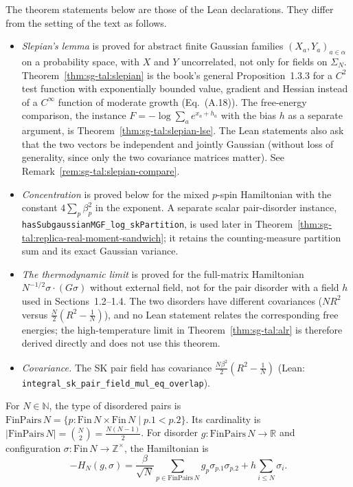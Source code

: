 \begin{remark}\label{rem:sg-tal:dev-11}
The theorem statements below are those of the Lean declarations. They differ from the setting of the text as follows.
\begin{itemize}
\item \emph{Slepian's lemma} is proved for abstract finite Gaussian families $(X_a,Y_a)_{a\in\alpha}$ on a probability space, with $X$ and $Y$ uncorrelated, not only for fields on $\Sigma_N$.
  Theorem~\ref{thm:sg-tal:slepian} is the book's general Proposition~1.3.3 for a $C^2$ test function with exponentially bounded value, gradient and Hessian instead of a $C^\infty$ function of moderate growth (Eq.~(A.18)). The free-energy comparison, the instance $F=-\log\sum_ae^{x_a+h_a}$ with the bias $h$ as a separate argument, is Theorem~\ref{thm:sg-tal:slepian-lse}. The Lean statements also ask that the two vectors be independent and jointly Gaussian (without loss of generality, since only the two covariance matrices matter). See Remark~\ref{rem:sg-tal:slepian-compare}.
\item \emph{Concentration} is proved below for the mixed $p$-spin Hamiltonian with the constant $4\sum_p\beta_p^2$ in the exponent. A separate scalar pair-disorder instance, \texttt{hasSubgaussianMGF\_log\_skPartition}, is used later in Theorem~\ref{thm:sg-tal:replica-real-moment-sandwich}; it retains the counting-measure partition sum and its exact Gaussian variance.
\item \emph{The thermodynamic limit} is proved for the full-matrix Hamiltonian $N^{-1/2}\sigma\cdot(G\sigma)$ without external field, not for the pair disorder with a field $h$ used in Sections~1.2--1.4. The two disorders have different covariances ($NR^2$ versus $\frac N2(R^2-\frac1N)$), and no Lean statement relates the corresponding free energies; the high-temperature limit in Theorem~\ref{thm:sg-tal:alr} is therefore derived directly and does not use this theorem.
\item \emph{Covariance.} The SK pair field has covariance $\frac{N\beta^2}{2}(R^2-\frac1N)$ (Lean: \texttt{integral\_sk\_pair\_field\_mul\_eq\_overlap}).
\end{itemize}
\end{remark}

\begin{definition}\label{def:sg-tal:hamiltonian}
  \leanok
{}
For $N \in \mathbb{N}$, the type of disordered pairs is $\mathrm{FinPairs}\,N = \{p : \mathrm{Fin}\,N \times \mathrm{Fin}\,N \mid p.1 < p.2\}$.
Its cardinality is $|\mathrm{FinPairs}\,N| = \binom{N}{2} = \frac{N(N-1)}{2}$.
For disorder $g : \mathrm{FinPairs}\,N \to \mathbb{R}$ and configuration $\sigma : \mathrm{Fin}\,N \to \mathbb{Z}^\times$, the Hamiltonian is
\[
-H_N(g, \sigma) = \frac{\beta}{\sqrt{N}} \sum_{p \in \mathrm{FinPairs}\,N} g_p \sigma_{p.1} \sigma_{p.2} + h \sum_{i \le N} \sigma_i.
\]
\end{definition}

